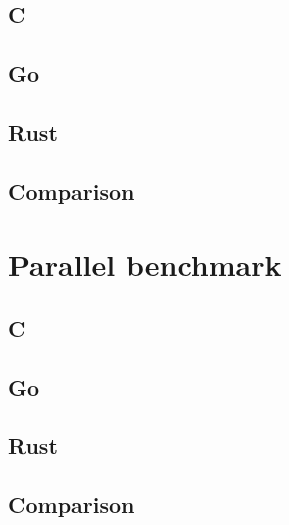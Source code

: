 \subsection{C}
\label{subsec:Implementation::SequentialBenchmark::C}


\subsection{Go}
\label{subsec:Implementation::SequentialBenchmark::Go}


\subsection{Rust}
\label{subsec:Implementation::SequentialBenchmark::Rust}


\subsection{Comparison}
\label{subsec:Implementation::SequentialBenchmark::Comparison}



\section{Parallel benchmark}
\label{sec:Implementation::ParallelBenchmark}



\subsection{C}
\label{subsec:Implementation::ParallelBenchmark::C}


\subsection{Go}
\label{subsec:Implementation::ParallelBenchmark::Go}


\subsection{Rust}
\label{subsec:Implementation::ParallelBenchmark::Rust}


\subsection{Comparison}
\label{subsec:Implementation::ParallelBenchmark::Comparison}
